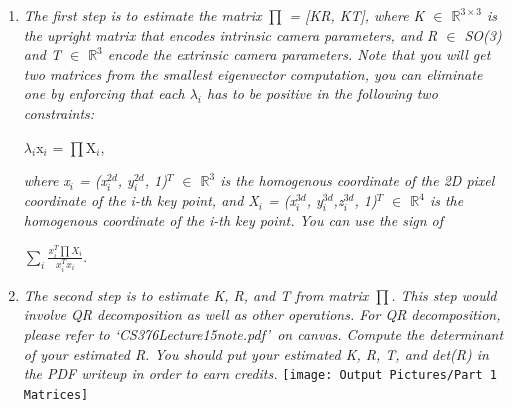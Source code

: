 \documentclass[11pt]{article}
\begin{document}
\begin{enumerate}
        \item \textit{The first step is to estimate the matrix $\prod$ = [KR, KT], where K $\in$
            $\mathbb{R}^{3\times3}$ is the upright matrix that encodes intrinsic camera parameters, and R $\in$ SO(3)
            and T $\in$ $\mathbb{R}^{3}$ encode the extrinsic camera parameters. Note that you will get two matrices
            from the smallest eigenvector computation, you can eliminate one by enforcing that each $\lambda_i$ has
            to be positive in the following two constraints:}
        \begin{center}
            $\lambda_i$x$_i$ = $\prod$X$_i$,
        \end{center}
        \textit{where x$_i$ = (x$_i^{2d}$, y$_i^{2d}$, 1)$^T$ $\in$ $\mathbb{R}^{3}$ is the homogenous coordinate of
        the 2D pixel coordinate of the i-th key point, and X$_i$ = (x$_i^{3d}$, y$_i^{3d}$,z$_i^{3d}$, 1)$^T$ $\in$
            $\mathbb{R}^{4}$ is the homogenous coordinate of the i-th key point. You can use the sign of }
        \begin{center}
            $\sum_{i}\frac{x_{i}^{T}\prod X_{i}}{x_{i}^{T}x_{i}}$.
        \end{center}

        \item \textit{The second step is to estimate K, R, and T from matrix $\prod$. This step would involve QR
        decomposition as well as other operations. For QR decomposition, please refer to
        \textquoteleft CS376Lecture15note.pdf\textquoteright\ on canvas. Compute the determinant of your estimated R.
        You should put your estimated K, R, T, and det(R) in the PDF writeup in order to earn credits.}\newline
        \texttt{[image: Output Pictures/Part 1 Matrices]}\newline


\end{enumerate}
\end{document}
